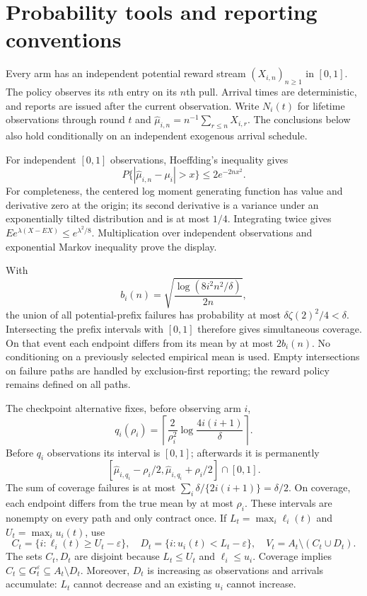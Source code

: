 \section{Probability tools and reporting conventions}
\label{app:tools}

Every arm has an independent potential reward stream $(X_{i,n})_{n\ge1}$
in $[0,1]$. The policy observes its $n$th entry on its $n$th pull. Arrival
times are deterministic, and reports are issued after the current observation.
Write $N_i(t)$ for lifetime observations through round $t$ and
$\widehat\mu_{i,n}=n^{-1}\sum_{r\le n}X_{i,r}$. The conclusions below also
hold conditionally on an independent exogenous arrival schedule.

For independent $[0,1]$ observations, Hoeffding's inequality gives
\[
 P\{|\widehat\mu_{i,n}-\mu_i|>x\}\le2e^{-2nx^2}.
\]
For completeness, the centered log moment generating function has value and
derivative zero at the origin; its second derivative is a variance under an
exponentially tilted distribution and is at most $1/4$. Integrating twice
gives $Ee^{\lambda(X-EX)}\le e^{\lambda^2/8}$. Multiplication over independent
observations and exponential Markov inequality prove the display.

With
\[
 b_i(n)=\sqrt{\frac{\log(8i^2n^2/\delta)}{2n}},
\]
the union of all potential-prefix failures has probability at most
$\delta\zeta(2)^2/4<\delta$. Intersecting the prefix intervals with $[0,1]$
therefore gives simultaneous coverage. On that event each endpoint differs
from its mean by at most $2b_i(n)$. No conditioning on a previously selected
empirical mean is used. Empty intersections on failure paths are handled by
exclusion-first reporting; the reward policy remains defined on all paths.

The checkpoint alternative fixes, before observing arm $i$,
\[
 q_i(\rho_i)=\left\lceil\frac2{\rho_i^2}
            \log\frac{4i(i+1)}\delta\right\rceil.
\]
Before $q_i$ observations its interval is $[0,1]$; afterwards it is permanently
\[
 [\widehat\mu_{i,q_i}-\rho_i/2,
  \widehat\mu_{i,q_i}+\rho_i/2]\cap[0,1].
\]
The sum of coverage failures is at most
$\sum_i\delta/\{2i(i+1)\}=\delta/2$. On coverage, each endpoint differs from
the true mean by at most $\rho_i$. These intervals are nonempty on every path
and only contract once. If $L_t=\max_i\ell_i(t)$ and
$U_t=\max_i u_i(t)$, use
\[
 C_t=\{i:\ell_i(t)\ge U_t-\varepsilon\},\quad
 D_t=\{i:u_i(t)<L_t-\varepsilon\},\quad
 V_t=A_t\setminus(C_t\cup D_t).
\]
The sets $C_t,D_t$ are disjoint because $L_t\le U_t$ and $\ell_i\le u_i$.
Coverage implies $C_t\subseteq G_t^\varepsilon\subseteq A_t\setminus D_t$.
Moreover, $D_t$ is increasing as observations and arrivals accumulate:
$L_t$ cannot decrease and an existing $u_i$ cannot increase.

